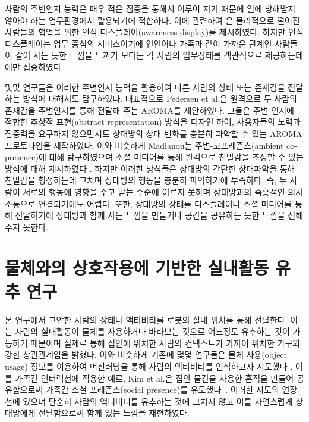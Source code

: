 사람의 주변인지 능력은 매우 적은 집중을 통해서 이루어 지기 때문에 일에 방해받지 않아야 하는 업무환경에서 활용되기에 적합하다. 이에 관련하여 \cite{cadiz1998awareness, dabbish2004controlling}은 물리적으로 떨어진 사람들의 협업을 위한 인식 디스플레이(awareness display)를 제시하였다. 
하지만 인식 디스플레이는 업무 중심의 서비스이기에 연인이나 가족과 같이 가까운 관계인 사람들이 같이 사는 듯한 느낌을 느끼기 보다는 각 사람의 업무상태를 객관적으로 제공하는데에만 집중하였다.

몇몇 연구들은 이러한 주변인지 능력을 활용하여 다른 사람의 상태 또는 존재감을 전달하는 방식에 대해서도 탐구하였다. 대표적으로 Pedersen et al.은 원격으로 두 사람의 존재감을 주변인지를 통해 전달해 주는 AROMA를 제안하였다\cite{pedersen1997aroma}. 그들은 주변 인지에 적합한 추상적 표현(abstract representation) 방식을 디자인 하여, 사용자들의 노력과 집중력을 요구하지 않으면서도 상대방의 상태 변화를 충분히 파악할 수 있는 AROMA 프로토타입을 제작하였다. 이와 비슷하게 Madianou는 주변-코프레즌스(ambient co-presence)에 대해 탐구하였으며 소셜 미디어를 통해 원격으로 친밀감을 조성할 수 있는 방식에 대해 제시하였다 \cite{madianou2016ambient}. 
하지만 이러한 방식들은 상대방의 간단한 상태파악을 통해 친밀감을 형성하는데 그치며 상대방의 행동을 충분히 파악하기에 부족하다. 즉, 두 사람이 서로의 행동에 영향을 주고 받는 수준에 이르지 못하며 상대방과의 즉흥적인 의사소통으로 연결되기에도 어렵다. 또한, 상대방의 상태를 디스플레이나 소셜 미디어를 통해 전달하기에 상대방과 함께 사는 느낌을 만들거나 공간을 공유하는 듯한 느낌을 전해주지 못한다.


\section{물체와의 상호작용에 기반한 실내활동 유추 연구}

본 연구에서 고안한  사람의 상태나 액티비티를 로봇의 실내 위치를 통해 전달한다. 이는 사람의 실내활동이 물체를 사용하거나 바라보는 것으로 어느정도 유추하는 것이 가능하기 때문이며 실제로  통해 집안에 위치한 사람의 컨텍스트가 가까이 위치한 가구와 강한 상관관계임을 밝혔다.
이와 비슷하게 기존에 몇몇 연구들은 물체 사용(object usage) 정보를 이용하여 머신러닝을 통해 사람의 액티비티를 인식하고자 시도했다 \cite{patterson2005fine, philipose2004inferring, wu2007scalable}.
이를 가족간 인터랙션에 적용한 예로, Kim et al.은 집안 물건을 사용한 흔적을 만들어 공유함으로써 가족간 소셜 프레즌스(social presence)를 유도했다~\cite{kim2017internet}. 
 이러한 시도의 연장선에 있으며 단순히 사람의 액티비티를 유추하는 것에 그치지 않고 이를 자연스럽게 상대방에게 전달함으로써 함께 있는 느낌을 재현하였다.